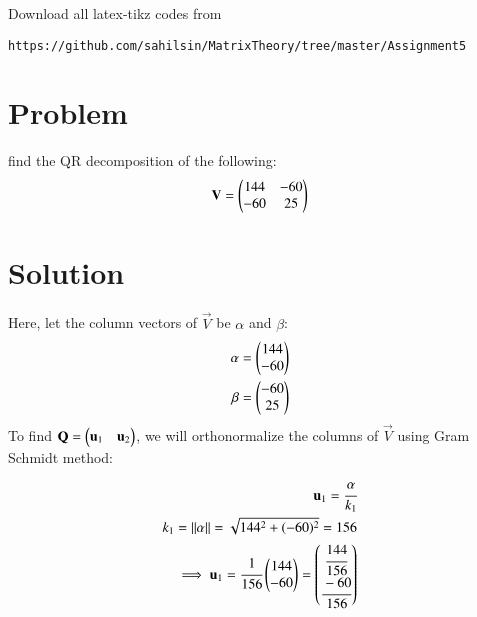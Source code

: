 Download all latex-tikz codes from 
%
\begin{lstlisting}
https://github.com/sahilsin/MatrixTheory/tree/master/Assignment5
\end{lstlisting}
\section{Problem}
find the QR decomposition of the following:\\
\begin{align}
\mathbf{V}=\begin{pmatrix}144 & -60 \\-60 & 25\end{pmatrix}\label{eq:2.0.3}
\end{align}
\section{Solution}
Here, let the column vectors of $\vec{V}$ be $\alpha$ and $\beta$:
\begin{align}
\alpha=\begin{pmatrix}144 \\ -60\end{pmatrix}\\
\beta=\begin{pmatrix}-60 \\25\end{pmatrix}
\end{align}
To find $\mathbf{Q}=\begin{pmatrix}\mathbf{u}_1 &\mathbf{u}_2\end{pmatrix}$, we will orthonormalize the columns of $\vec{V}$ using Gram Schmidt method:
\begin{align}
\mathbf{u}_1=\cfrac{\alpha}{k_1}\\
k_1=\left\lVert\alpha\right\rVert=\sqrt{144^2+(-60)^2}=156\\
\implies \mathbf{u}_1=\cfrac{1}{156}\begin{pmatrix}144 \\ -60\end{pmatrix}=\begin{pmatrix}\cfrac{144}{156} \\ \cfrac{-60}{156}\end{pmatrix}
\end{align}

